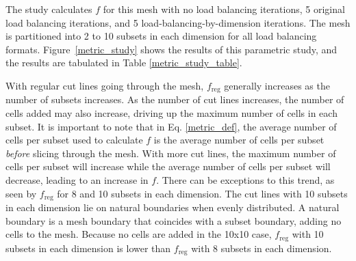 \documentclass[times,final]{elsarticle}
\begin{document}
The study calculates $f$ for this mesh with no load balancing iterations, 5 original load balancing iterations, and 5 load-balancing-by-dimension iterations.
The mesh is partitioned into 2 to 10 subsets in each dimension for all load balancing formats.
Figure~\ref{metric_study} shows the results of this parametric study, and the results are tabulated in Table \ref{metric_study_table}.

With regular cut lines going through the mesh, $f_\text{reg}$ generally increases as the number of subsets increases.
As the number of cut lines increases, the number of cells added may also increase, driving up the maximum number of cells in each subset. 
It is important to note that in Eq. \ref{metric_def}, the average number of cells per subset used to calculate $f$ is the average number of cells per subset \textit{before} slicing through the mesh.
With more cut lines, the maximum number of cells per subset will increase while the average number of cells per subset will decrease, leading to an increase in $f$. There can be exceptions to this trend, as seen by ${f_\text{reg}}$ for 8 and 10 subsets in each dimension.
The cut lines with 10 subsets in each dimension lie on natural boundaries when evenly distributed.
A natural boundary is a mesh boundary that coincides with a subset boundary, adding no cells to the mesh.
Because no cells are added in the 10x10 case, $f_{\text{reg}}$ with 10 subsets in each dimension is lower than $f_{\text{reg}}$ with 8 subsets in each dimension.
\end{document}
